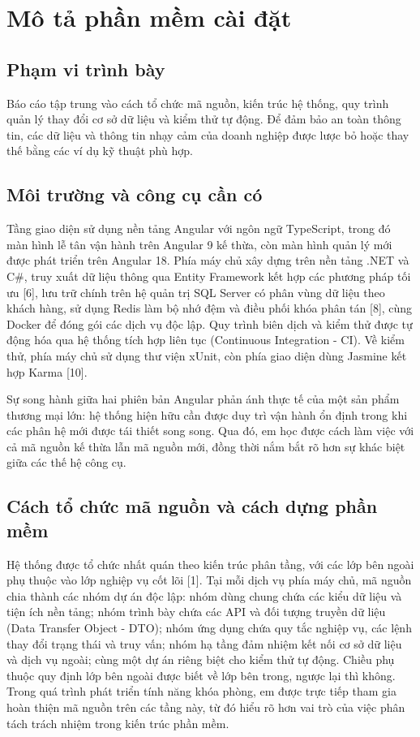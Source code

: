 \section{Mô tả phần mềm cài đặt}

\subsection{Phạm vi trình bày}

Báo cáo tập trung vào cách tổ chức mã nguồn, kiến trúc hệ thống, quy trình quản lý thay đổi cơ sở dữ liệu và kiểm thử tự động. Để đảm bảo an toàn thông tin, các dữ liệu và thông tin nhạy cảm của doanh nghiệp được lược bỏ hoặc thay thế bằng các ví dụ kỹ thuật phù hợp.

\subsection{Môi trường và công cụ cần có}

Tầng giao diện sử dụng nền tảng Angular với ngôn ngữ TypeScript, trong đó màn hình lễ tân vận hành trên Angular 9 kế thừa, còn màn hình quản lý mới được phát triển trên Angular 18. Phía máy chủ xây dựng trên nền tảng .NET và C\#, truy xuất dữ liệu thông qua Entity Framework kết hợp các phương pháp tối ưu [6], lưu trữ chính trên hệ quản trị SQL Server có phân vùng dữ liệu theo khách hàng, sử dụng Redis làm bộ nhớ đệm và điều phối khóa phân tán [8], cùng Docker để đóng gói các dịch vụ độc lập. Quy trình biên dịch và kiểm thử được tự động hóa qua hệ thống tích hợp liên tục (Continuous Integration - CI). Về kiểm thử, phía máy chủ sử dụng thư viện xUnit, còn phía giao diện dùng Jasmine kết hợp Karma [10].

Sự song hành giữa hai phiên bản Angular phản ánh thực tế của một sản phẩm thương mại lớn: hệ thống hiện hữu cần được duy trì vận hành ổn định trong khi các phân hệ mới được tái thiết song song. Qua đó, em học được cách làm việc với cả mã nguồn kế thừa lẫn mã nguồn mới, đồng thời nắm bắt rõ hơn sự khác biệt giữa các thế hệ công cụ.

\subsection{Cách tổ chức mã nguồn và cách dựng phần mềm}

Hệ thống được tổ chức nhất quán theo kiến trúc phân tầng, với các lớp bên ngoài phụ thuộc vào lớp nghiệp vụ cốt lõi [1]. Tại mỗi dịch vụ phía máy chủ, mã nguồn chia thành các nhóm dự án độc lập: nhóm dùng chung chứa các kiểu dữ liệu và tiện ích nền tảng; nhóm trình bày chứa các API và đối tượng truyền dữ liệu (Data Transfer Object - DTO); nhóm ứng dụng chứa quy tắc nghiệp vụ, các lệnh thay đổi trạng thái và truy vấn; nhóm hạ tầng đảm nhiệm kết nối cơ sở dữ liệu và dịch vụ ngoài; cùng một dự án riêng biệt cho kiểm thử tự động. Chiều phụ thuộc quy định lớp bên ngoài được biết về lớp bên trong, ngược lại thì không. Trong quá trình phát triển tính năng khóa phòng, em được trực tiếp tham gia hoàn thiện mã nguồn trên các tầng này, từ đó hiểu rõ hơn vai trò của việc phân tách trách nhiệm trong kiến trúc phần mềm.

